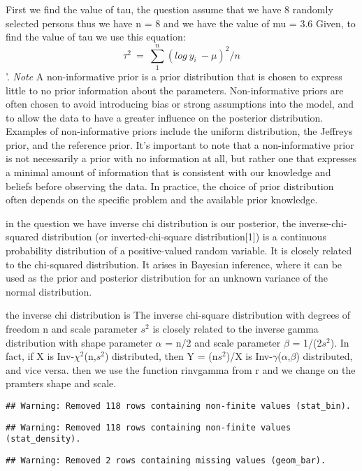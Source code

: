 \documentclass[
]{article}
\begin{document}
First we find the value of tau, the question assume that we have 8
randomly selected persons thus we have n = 8 and we have the value of mu
= 3.6 Given, to find the value of tau we use this equation:
\[\tau^2\ =\ \sum_1^n(log\ y_i \ - \mu)^2/n\]'. \emph{Note} A
non-informative prior is a prior distribution that is chosen to express
little to no prior information about the parameters. Non-informative
priors are often chosen to avoid introducing bias or strong assumptions
into the model, and to allow the data to have a greater influence on the
posterior distribution. Examples of non-informative priors include the
uniform distribution, the Jeffreys prior, and the reference prior. It's
important to note that a non-informative prior is not necessarily a
prior with no information at all, but rather one that expresses a
minimal amount of information that is consistent with our knowledge and
beliefs before observing the data. In practice, the choice of prior
distribution often depends on the specific problem and the available
prior knowledge.

in the question we have inverse chi distribution is our posterior, the
inverse-chi-squared distribution (or inverted-chi-square
distribution{[}1{]}) is a continuous probability distribution of a
positive-valued random variable. It is closely related to the
chi-squared distribution. It arises in Bayesian inference, where it can
be used as the prior and posterior distribution for an unknown variance
of the normal distribution.

the inverse chi distribution is The inverse chi-square distribution with
degrees of freedom n and scale parameter \(s^2\) is closely related to
the inverse gamma distribution with shape parameter \(\alpha\) = n/2 and
scale parameter \(\beta\) = 1/(2\(s^2\)). In fact, if X is
Inv-\(\chi^2\)(n,\(s^2\)) distributed, then Y = (n\(s^2\))/X is
Inv-\(\gamma\)(\(\alpha\),\(\beta\)) distributed, and vice versa. then
we use the function rinvgamma from r and we change on the pramters shape
and scale.

\begin{verbatim}
## Warning: Removed 118 rows containing non-finite values (stat_bin).
\end{verbatim}

\begin{verbatim}
## Warning: Removed 118 rows containing non-finite values (stat_density).
\end{verbatim}

\begin{verbatim}
## Warning: Removed 2 rows containing missing values (geom_bar).
\end{verbatim}
\end{document}

